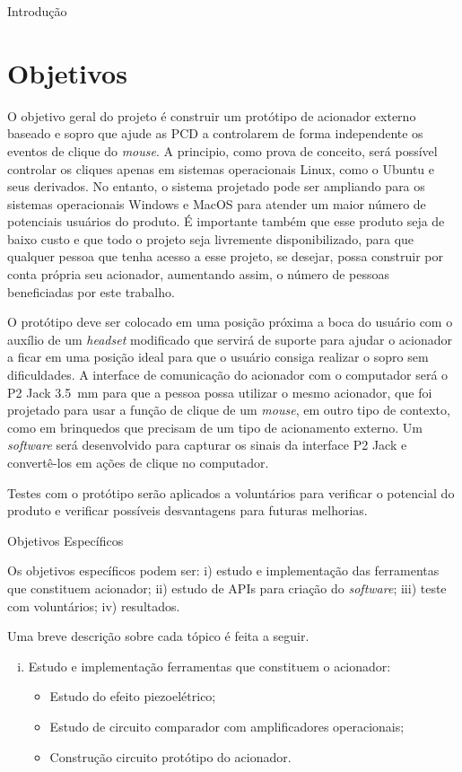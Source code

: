 \begin{chapter}{Introdução}
\section{Objetivos}

O objetivo geral do projeto é construir um protótipo de acionador externo
baseado e sopro que ajude as PCD a controlarem de forma independente os eventos
de clique do \textit{mouse}. A principio, como prova de conceito, será possível
controlar os cliques apenas em sistemas operacionais Linux, como o Ubuntu e seus
derivados. No entanto, o sistema projetado pode ser ampliando para os sistemas
operacionais Windows e MacOS para atender um maior número de potenciais usuários
do produto. É importante também que esse produto seja de baixo custo e que todo
o projeto seja livremente disponibilizado, para que qualquer pessoa que tenha
acesso a esse projeto, se desejar, possa construir por conta própria seu
acionador, aumentando assim, o número de pessoas beneficiadas por este trabalho.

O protótipo deve ser colocado em uma posição próxima a boca do usuário com o auxílio
de um \textit{headset} modificado que servirá de suporte para ajudar o acionador
a ficar em uma posição ideal para que o usuário consiga realizar o sopro sem
dificuldades. A interface de comunicação do acionador com o computador será o
P2 Jack 3.5~mm para que a pessoa possa utilizar o mesmo acionador, que foi
projetado para usar a função de clique de um \textit{mouse}, em outro tipo de
contexto, como em brinquedos que precisam de um tipo de acionamento externo. Um
\textit{software} será desenvolvido para capturar os sinais da interface P2 Jack
e convertê-los em ações de clique no computador.

Testes com o protótipo serão aplicados a voluntários para verificar o potencial
do produto e verificar possíveis desvantagens para futuras melhorias.

\begin{subsection}{Objetivos Específicos}

Os objetivos específicos podem ser:
i) estudo e implementação das ferramentas que constituem acionador;
ii) estudo de APIs para criação do \textit{software};
iii) teste com voluntários;
iv) resultados.

Uma breve descrição sobre cada tópico é feita a seguir.

\begin{enumerate}[i)]

\setlength\itemsep{-.2cm}
	\item Estudo e implementação ferramentas que constituem o acionador: \vspace{-.2cm}
	\begin{itemize}
		\item Estudo do efeito piezoelétrico;
		\item Estudo de circuito comparador com amplificadores operacionais;
		\item Construção circuito protótipo do acionador.
	\end{itemize}


\end{enumerate}
\end{subsection}
\end{chapter}
